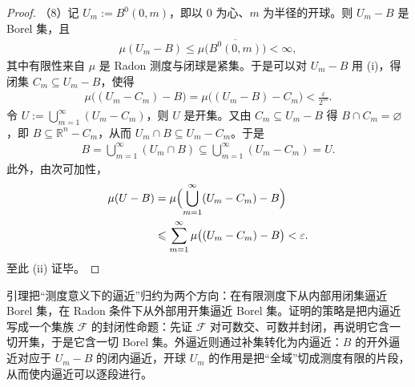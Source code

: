 \documentclass[../../main.tex]{subfiles}
\begin{document}
\begin{proof}
（8）记 $U_{m}:=B^{0}(0,m)$，即以 $0$ 为心、$m$ 为半径的开球。则 $U_{m}-B$ 是 Borel 集，且
\begin{align*}
\mu(U_{m}-B)\leqslant\mu\bigl(\overline{B^{0}(0,m)}\bigr)<\infty,
\end{align*}
其中有限性来自 $\mu$ 是 Radon 测度与闭球是紧集。于是可以对 $U_{m}-B$ 用 (i)，得闭集 $C_{m}\subseteq U_{m}-B$，使得
\begin{align*}
\mu\bigl((U_{m}-C_{m})-B\bigr)=\mu\bigl((U_{m}-B)-C_{m}\bigr)<\frac{\varepsilon}{2^{m}}.
\end{align*}
令 $U:=\bigcup_{m=1}^{\infty}(U_{m}-C_{m})$，则 $U$ 是开集。又由 $C_{m}\subseteq U_{m}-B$ 得 $B\cap C_{m}=\varnothing$，即 $B\subseteq\mathbb{R}^{n}-C_{m}$，从而 $U_{m}\cap B\subseteq U_{m}-C_{m}$。于是
\begin{align*}
B=\bigcup_{m=1}^{\infty}(U_{m}\cap B)\subseteq\bigcup_{m=1}^{\infty}(U_{m}-C_{m})=U.
\end{align*}
此外，由次可加性，
\begin{align*}
\mu(U-B)&=\mu\Bigl(\bigcup_{m=1}^{\infty}(U_{m}-C_{m})-B\Bigr)\\
&\leqslant\sum_{m=1}^{\infty}\mu\bigl((U_{m}-C_{m})-B\bigr)<\varepsilon.
\end{align*}
至此 (ii) 证毕。
\end{proof}

\begin{remark}\label{remark:ch01-lem-1-1-闭开动机}
引理把“测度意义下的逼近”归约为两个方向：在有限测度下从内部用闭集逼近 Borel 集，在 Radon 条件下从外部用开集逼近 Borel 集。证明的策略是把内逼近写成一个集族 $\mathcal{F}$ 的封闭性命题：先证 $\mathcal{F}$ 对可数交、可数并封闭，再说明它含一切开集，于是它含一切 Borel 集。外逼近则通过补集转化为内逼近：$B$ 的开外逼近对应于 $U_{m}-B$ 的闭内逼近，开球 $U_{m}$ 的作用是把“全域”切成测度有限的片段，从而使内逼近可以逐段进行。
\end{remark}
\end{document}
